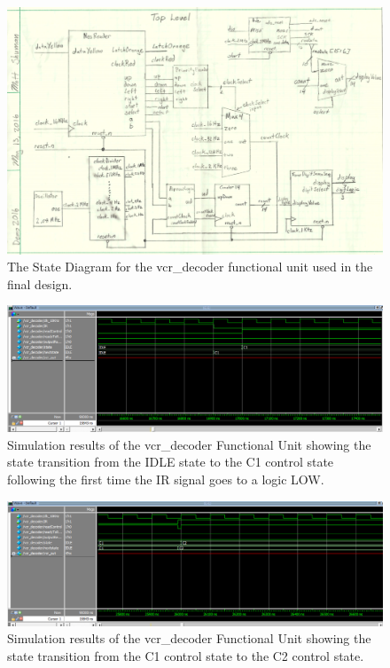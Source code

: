 \documentclass[a4paper]{article}
\begin{document}
\begin{figure}[h]
  \centering
    \includegraphics[width=.8\textwidth]{images/functional_1.png}
	\caption{The State Diagram for the vcr\_decoder functional unit used in the final design.}
    \label{fig:functional-1}
\end{figure}
\begin{figure}[h]
  \centering
    \includegraphics[width=.98\textwidth]{sims/vcr_testing/moduleTests/vcr_decoder/IDLE_to_C1_Transition.png}
	\caption{Simulation results of the vcr\_decoder Functional Unit showing the state transition from the IDLE state to the C1 control state following the first time the IR signal goes to a logic LOW.}
    \label{fig:top-level-sim}
\end{figure}
\begin{figure}[h]
  \centering
    \includegraphics[width=.98\textwidth]{sims/vcr_testing/moduleTests/vcr_decoder/C1_to_C2_transition.png}
	\caption{Simulation results of the vcr\_decoder Functional Unit showing the state transition from the C1 control state to the C2 control state.}
    \label{fig:top-level-sim}
\end{figure}
\end{document}
